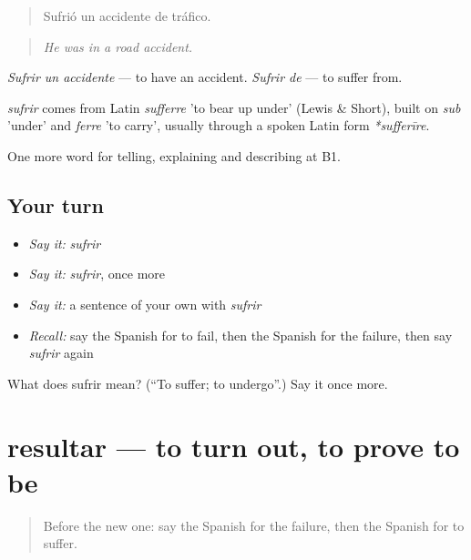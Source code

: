 \begin{quote}
Sufrió un accidente de tráfico.
\end{quote}

\begin{quote}
\emph{He was in a road accident.}
\end{quote}

\emph{Sufrir un accidente} — to have an accident. \emph{Sufrir de} — to suffer from.

\begin{cousinweb}
\emph{sufrir} comes from Latin \emph{sufferre} 'to bear up under' (Lewis \& Short), built on \emph{sub} 'under' and \emph{ferre} 'to carry', usually through a spoken Latin form \emph{*sufferīre}.
\end{cousinweb}

\begin{grammarlens}[title={What you've built}]
One more word for telling, explaining and describing at B1.
\end{grammarlens}

\subsection*{Your turn}
\begin{itemize}
\raggedright
  \item \emph{Say it:} \emph{sufrir}
  \item \emph{Say it:} \emph{sufrir}, once more
  \item \emph{Say it:} a sentence of your own with \emph{sufrir}
  \item \emph{Recall:} say the Spanish for to fail, then the Spanish for the failure, then say \emph{sufrir} again
\end{itemize}

\begin{tcolorbox}[breakable,colback=teal!4,colframe=teal!35!black,title={Before you move on}]
What does sufrir mean? (\textquotedblleft{}To suffer; to undergo\textquotedblright{}.) Say it once more.
\end{tcolorbox}
\section[resultar]{resultar — to turn out, to prove to be}

\label{lesson:ES-C573-resultar}



\begin{quote}
Before the new one: say the Spanish for the failure, then the Spanish for to suffer.
\end{quote}

